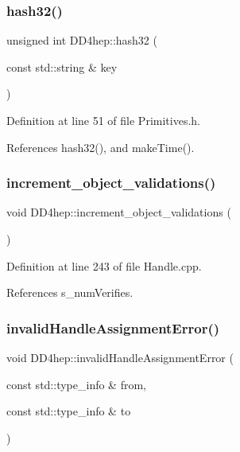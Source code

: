 \hypertarget{namespace_d_d4hep_a856fab7f400a9e8c0e3f999f933d3883}{}\label{namespace_d_d4hep_a856fab7f400a9e8c0e3f999f933d3883} 
\subsubsection{\texorpdfstring{hash32()}{hash32()}\hspace{0.1cm}{\footnotesize\ttfamily [2/2]}}
{\footnotesize\ttfamily unsigned int D\+D4hep\+::hash32 (\begin{DoxyParamCaption}\item[{const std\+::string \&}]{key }\end{DoxyParamCaption})\hspace{0.3cm}{\ttfamily [inline]}}



Definition at line 51 of file Primitives.\+h.



References hash32(), and make\+Time().

\hypertarget{namespace_d_d4hep_a74a35c08bae34ad9a479a1726eafab98}{}\label{namespace_d_d4hep_a74a35c08bae34ad9a479a1726eafab98} 
\subsubsection{\texorpdfstring{increment\+\_\+object\+\_\+validations()}{increment\_object\_validations()}}
{\footnotesize\ttfamily void D\+D4hep\+::increment\+\_\+object\+\_\+validations (\begin{DoxyParamCaption}{ }\end{DoxyParamCaption})}



Definition at line 243 of file Handle.\+cpp.



References s\+\_\+num\+Verifies.

\hypertarget{namespace_d_d4hep_a5f946a2ebf8795b6a70037ff00ad2aab}{}\label{namespace_d_d4hep_a5f946a2ebf8795b6a70037ff00ad2aab} 
\subsubsection{\texorpdfstring{invalid\+Handle\+Assignment\+Error()}{invalidHandleAssignmentError()}}
{\footnotesize\ttfamily void D\+D4hep\+::invalid\+Handle\+Assignment\+Error (\begin{DoxyParamCaption}\item[{const std\+::type\+\_\+info \&}]{from,  }\item[{const std\+::type\+\_\+info \&}]{to }\end{DoxyParamCaption})}




